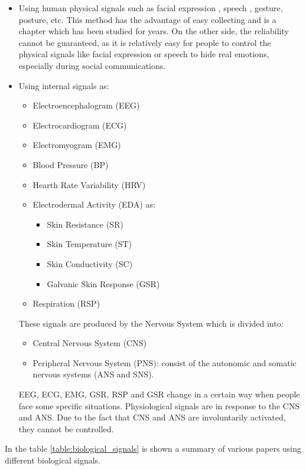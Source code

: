\begin{itemize}
	\item Using human physical signals such as facial expression \cite{zhang2016facial}, speech \cite{mao2014learning}, gesture, posture, etc. This method has the advantage of easy collecting and is a chapter which has been studied for years. On the other side, the reliability cannot be guaranteed, as it is relatively easy for people to control the physical signals like facial expression or speech to hide real emotions, especially during social communications.
	\item Using internal signals as:
	\begin{itemize}
		\item Electroencephalogram (EEG)
		\item Electrocardiogram (ECG)
		\item Electromyogram (EMG)
		\item Blood Pressure (BP)
		\item Hearth Rate Variability (HRV)
		\item Electrodermal Activity (EDA) as:
		\begin{itemize}
			\item Skin Resistance (SR)
			\item Skin Temperature (ST)
			\item Skin Conductivity (SC)
			\item Galvanic Skin Response (GSR)
		\end{itemize}
		\item Respiration (RSP)
	\end{itemize}
	These signals are produced by the Nervous System which is divided into:
	\begin{itemize}
		\item Central Nervous System (CNS)
		\item Peripheral Nervous System (PNS): consist of the autonomic and somatic nervous systems (ANS and SNS).
	\end{itemize}
	EEG, ECG, EMG, GSR, RSP and GSR change in a certain way when people face some specific situations. Physiological signals are in response to the CNS and ANS. Due to the fact that CNS and ANS are involuntarily activated, they cannot be controlled.
\end{itemize}
In the table \ref{table:biological_signals} is shown a summary of various papers using different biological signals.
